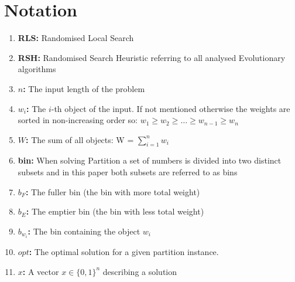 \section{Notation}
\begin{enumerate}
    \item \textbf{RLS:} Randomised Local Search
    \item \textbf{RSH:} Randomised Search Heuristic referring to all analysed Evolutionary algorithms
    \item \textbf{$n$:} The input length of the problem
    \item \textbf{$w_i$:} The $i$-th object of the input. If not mentioned otherwise the weights are sorted in non-increasing order so: \(w_1 \ge w_2 \ge \ldots \ge w_{n-1} \ge w_{n}\)
    \item \textbf{$W$:} The sum of all objects: W = $\sum_{i=1}^{n}w_i$
    \item \textbf{bin:} When solving Partition a set of numbers is divided into two distinct subsets and in this paper both subsets are referred to as bins
    \item \textbf{$b_F$:} The fuller bin (the bin with more total weight)
    \item \textbf{$b_E$:} The emptier bin (the bin with less total weight)
    \item \textbf{$b_{w_i}$:} The bin containing the object $w_i$
    \item \textbf{$opt$:} The optimal solution for a given partition instance.
    \item \textbf{$x$:} A vector $x \in {\{0, 1\}}^n$ describing a solution
\end{enumerate}